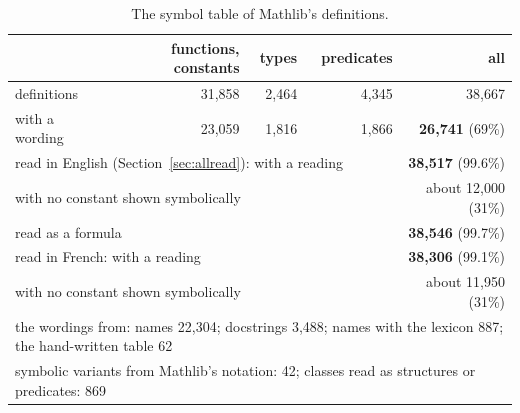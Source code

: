 \documentclass{easychair}
\begin{document}
\begin{table}[t]
\centering\footnotesize
\begin{tabular}{lrrrr}
\toprule
& functions, constants & types & predicates & all \\
\midrule
definitions & 31,858 & 2,464 & 4,345 & 38,667 \\
with a wording & 23,059 & 1,816 & 1,866 & \textbf{26,741} (69\%) \\
\midrule
\multicolumn{4}{l}{read in English (Section~\ref{sec:allread}): with a reading} & \textbf{38,517} (99.6\%) \\
\multicolumn{4}{l}{\quad with no constant shown symbolically} & about 12,000 (31\%) \\
\multicolumn{4}{l}{read as a formula} & \textbf{38,546} (99.7\%) \\
\multicolumn{4}{l}{read in French: with a reading} & \textbf{38,306} (99.1\%) \\
\multicolumn{4}{l}{\quad with no constant shown symbolically} & about 11,950 (31\%) \\
\midrule
\multicolumn{5}{l}{the wordings from: names 22,304; docstrings 3,488; names with the lexicon 887;
the hand-written table 62} \\
\multicolumn{5}{l}{symbolic variants from Mathlib's notation: 42; classes read as structures or
predicates: 869} \\
\bottomrule
\end{tabular}
\caption{The symbol table of Mathlib's definitions.}
\label{tab:sources}
\end{table}
\end{document}

